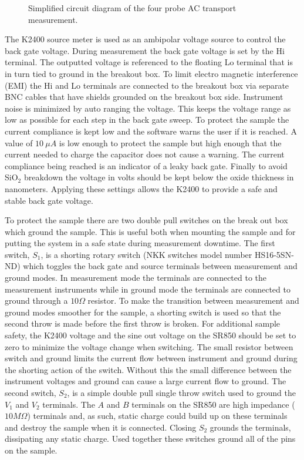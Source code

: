 \begin{figure}
	\begin{center}
	
	\end{center}
	\caption[Simplified circuit diagram of four probe AC transport measurements]{\label{fig:elec:min}
		Simplified circuit diagram of the four probe AC transport measurement.
	}
\end{figure}

The K2400 source meter is used as an ambipolar voltage source to control the back gate voltage.
During measurement the back gate voltage is set by the Hi terminal.
The outputted voltage is referenced to the floating Lo terminal that is in turn tied to ground in the breakout box.
To limit electro magnetic interference (EMI) the Hi and Lo terminals are connected to the breakout box via separate BNC cables that have shields grounded on the breakout box side.
Instrument noise is minimized by auto ranging the voltage.
This keeps the voltage range as low as possible for each step in the back gate sweep.
To protect the sample the current compliance is kept low and the software warns the user if it is reached.
A value of $10 \ \mu A$ is low enough to protect the sample but high enough that the current needed to charge the capacitor does not cause a warning.
The current compliance being reached is an indicator of a leaky back gate.
Finally to avoid SiO$_2$ breakdown the voltage in volts should be kept below the oxide thickness in nanometers.
Applying these settings allows the K2400 to provide a safe and stable back gate voltage.

To protect the sample there are two double pull switches on the break out box which ground the sample.
This is useful both when mounting the sample and for putting the system in a safe state during measurement downtime.
The first switch, $S_1$, is a shorting rotary switch (NKK switches model number HS16-5SN-ND) which toggles the back gate and source terminals between measurement and ground modes.
In measurement mode the terminals are connected to the measurement instruments while in ground mode the terminals are connected to ground through a $10 \Omega$ resistor.
To make the transition between measurement and ground modes smoother for the sample, a shorting switch is used so that the second throw is made before the first throw is broken.
For additional sample safety, the K2400 voltage and the sine out voltage on the SR850 should be set to zero to minimize the voltage change when switching.
The small resistor between switch and ground limits the current flow between instrument and ground during the shorting action of the switch.
Without this the small difference between the instrument voltages and ground can cause a large current flow to ground.
The second switch, $S_2$, is a simple double pull single throw switch used to ground the $V_1$ and $V_2$ terminals.
The $A$ and $B$ terminals on the SR850 are high impedance ($10 M \Omega$) terminals and, as such, static charge could build up on these terminals and destroy the sample when it is connected.
Closing $S_2$ grounds the terminals, dissipating any static charge.
Used together these switches ground all of the pins on the sample.

